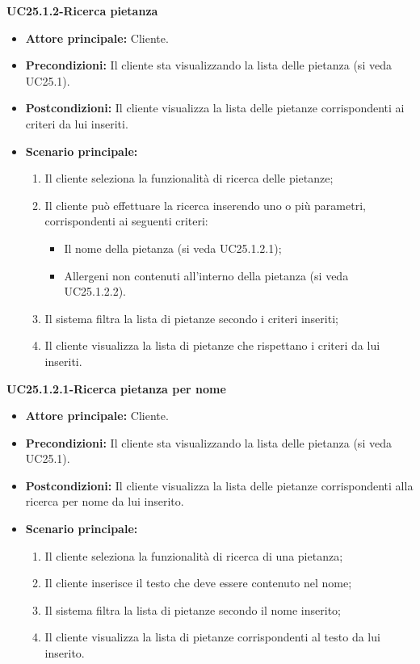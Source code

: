 \textbf{UC25.1.2-Ricerca pietanza}
\begin{itemize}
\item \textbf{Attore principale:} Cliente.
\item \textbf{Precondizioni:}  Il cliente sta visualizzando la lista delle pietanza (si veda UC25.1).
\item \textbf{Postcondizioni:} Il cliente visualizza la lista delle pietanze corrispondenti ai criteri da lui inseriti.
\item \textbf{Scenario principale:}
\begin{enumerate}
    \item Il cliente seleziona la funzionalità di ricerca delle pietanze;
    \item Il cliente può effettuare la ricerca inserendo uno o più parametri, corrispondenti ai seguenti criteri:
    \begin{itemize}
        \item Il nome della pietanza (si veda UC25.1.2.1);
        \item Allergeni non contenuti all'interno della pietanza (si veda UC25.1.2.2).
    \end{itemize}
    \item Il sistema filtra la lista di pietanze secondo i criteri inseriti;
    \item Il cliente visualizza la lista di pietanze che rispettano i criteri da lui inseriti.
\end{enumerate}
\end{itemize}

\textbf{UC25.1.2.1-Ricerca pietanza per nome}
\begin{itemize}
\item \textbf{Attore principale:} Cliente.
\item \textbf{Precondizioni:}  Il cliente sta visualizzando la lista delle pietanza (si veda UC25.1).
\item \textbf{Postcondizioni:} Il cliente visualizza la lista delle pietanze corrispondenti alla ricerca per nome da lui inserito.
\item \textbf{Scenario principale:}
\begin{enumerate}
    \item Il cliente seleziona la funzionalità di ricerca di una pietanza;
    \item Il cliente inserisce il testo che deve essere contenuto nel nome;
    \item Il sistema filtra la lista di pietanze secondo il nome inserito;
    \item Il cliente visualizza la lista di pietanze corrispondenti al testo da lui inserito.
\end{enumerate}
\end{itemize}

